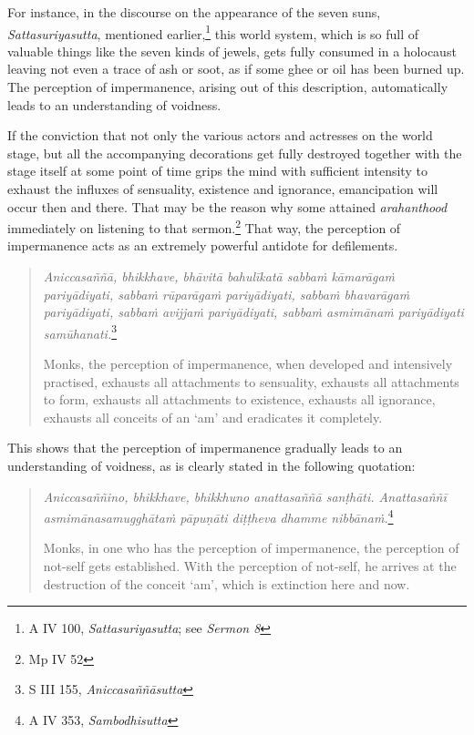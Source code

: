 For instance, in the discourse on the appearance of the seven suns, \emph{Sattasuriyasutta}, mentioned earlier,\footnote{A IV 100, \emph{Sattasuriyasutta}; see \emph{Sermon 8}} this world system, which is so full of valuable things like the seven kinds of jewels, gets fully consumed in a holocaust leaving not even a trace of ash or soot, as if some ghee or oil has been burned up. The perception of impermanence, arising out of this description, automatically leads to an understanding of voidness.

If the conviction that not only the various actors and actresses on the world stage, but all the accompanying decorations get fully destroyed together with the stage itself at some point of time grips the mind with sufficient intensity to exhaust the influxes of sensuality, existence and ignorance, emancipation will occur then and there. That may be the reason why some attained \emph{arahanthood} immediately on listening to that sermon.\footnote{Mp IV 52} That way, the perception of impermanence acts as an extremely powerful antidote for defilements.

\begin{quote}
\emph{Aniccasaññā, bhikkhave, bhāvitā bahulīkatā sabbaṁ kāmarāgaṁ pariyādiyati, sabbaṁ rūparāgaṁ pariyādiyati, sabbaṁ bhavarāgaṁ pariyādiyati, sabbaṁ avijjaṁ pariyādiyati, sabbaṁ asmimānaṁ pariyādiyati samūhanati.}\footnote{S III 155, \emph{Aniccasaññāsutta}}

Monks, the perception of impermanence, when developed and intensively practised, exhausts all attachments to sensuality, exhausts all attachments to form, exhausts all attachments to existence, exhausts all ignorance, exhausts all conceits of an `am' and eradicates it completely.
\end{quote}

This shows that the perception of impermanence gradually leads to an understanding of voidness, as is clearly stated in the following quotation:

\begin{quote}
\emph{Aniccasaññino, bhikkhave, bhikkhuno anattasaññā sanṭhāti. Anattasaññī asmimānasamugghātaṁ pāpuṇāti diṭṭheva dhamme nibbānaṁ.}\footnote{A IV 353, \emph{Sambodhisutta}}

Monks, in one who has the perception of impermanence, the perception of not-self gets established. With the perception of not-self, he arrives at the destruction of the conceit `am', which is extinction here and now.
\end{quote}

